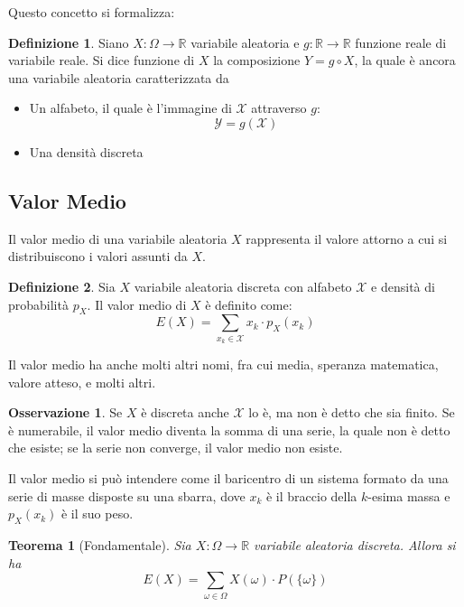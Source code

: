 \documentclass{article}
\theoremstyle{plain}
\newtheorem{teorema}{Teorema}[section]
\theoremstyle{definition}
\newtheorem{definizione}{Definizione}[section]
\newtheorem{osservazione}{Osservazione}[section]
\theoremstyle{remark}
\begin{document}
Questo concetto si formalizza:
\begin{definizione}
	Siano $X:\Omega\to\mathds{R}$ variabile aleatoria e $g:\mathds{R}\to\mathds{R}$ funzione reale di variabile reale. Si dice funzione di $X$ la composizione $Y=g\circ X$, la quale è ancora una variabile aleatoria caratterizzata da
	\begin{itemize}
		\item Un alfabeto, il quale è l'immagine di $\mathcal{X}$ attraverso $g$:
		\begin{equation*}
			\mathcal{Y}=g(\mathcal{X})
		\end{equation*}
		\item Una densità discreta %
	\end{itemize}
\end{definizione}
\subsection{Valor Medio} %
\label{sub:valor_medio}
Il valor medio di una variabile aleatoria $X$ rappresenta il valore attorno a cui si distribuiscono i valori assunti da $X$.
\begin{definizione}
	Sia $X$ variabile aleatoria discreta con alfabeto $\mathcal{X}$ e densità di probabilità $p_X$. Il valor medio di $X$ è definito come:
	\begin{equation*}
		E(X)=\sum_{x_k\in\mathcal{X}} x_k\cdot p_X(x_k)
	\end{equation*}
\end{definizione}
Il valor medio ha anche molti altri nomi, fra cui media, speranza matematica, valore atteso, e molti altri.
\begin{osservazione}
	Se $X$ è discreta anche $\mathcal{X}$ lo è, ma non è detto che sia finito. Se è numerabile, il valor medio diventa la somma di una serie, la quale non è detto che esiste; se la serie non converge, il valor medio non esiste.
\end{osservazione}
Il valor medio si può intendere come il baricentro di un sistema formato da una serie di masse disposte su una sbarra, dove $x_k$ è il braccio della $k$-esima massa e $p_X(x_k)$ è il suo peso.
\begin{teorema}[Fondamentale]
	Sia $X:\Omega\to\mathds{R}$ variabile aleatoria discreta. Allora si ha
	\begin{equation*}
		E(X)=\sum_{\omega\in\Omega} X(\omega)\cdot P(\{\omega\})
	\end{equation*}
\end{teorema}
\end{document}
